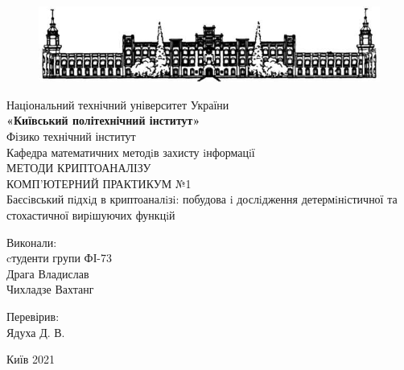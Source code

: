 \begin{center}
	\begin{figure}[ht]
		\centering
		\includegraphics[width=0.8\linewidth]{picture.png}	
	\end{figure}
	\hfill \break
	\footnotesize{Національний технічний університет України}\\ 
	\small{\textbf{«Київський політехнічний інститут»}}\\
	\hfill \break
	\normalsize{Фізико технічний інститут}\\
	\hfill \break
	\normalsize{Кафедра математичних методiв захисту iнформацiї}\\
	\hfill\break
	\LARGE{МЕТОДИ КРИПТОАНАЛІЗУ}\\
	\LARGE{КОМП’ЮТЕРНИЙ ПРАКТИКУМ №1}\\
	\hfill \break
	\Large{Баєсiвський пiдхiд в криптоаналiзi: побудова i
	дослiдження детермiнiстичної та стохастичної
	вирiшуючих функцiй}\\
    \hfill \break
    \hfill \break
	\hfill \break
	\hfill \break
	\hfill \break
	\hfill \break
	\end{center}
	
	
	\begin{flushright}
	Виконали:\\
	cтуденти групи ФІ-73\\
	Драга Владислав\\
	Чихладзе Вахтанг
	\end{flushright}

	\begin{flushright}
		Перевірив:\\
		Ядуха Д. В.

		\hfill \break
		\hfill \break
	\end{flushright}
	
	\thispagestyle{empty}
	\begin{center} Київ 2021\end{center}